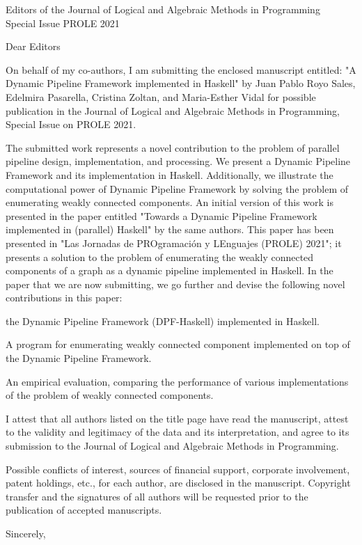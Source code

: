 \documentclass[english]{letter}
\begin{document}
\signature{Prof. Edelmira Pasarella}      


\begin{letter}{
    Editors of the Journal of Logical and Algebraic Methods in Programming\\
    Special Issue PROLE 2021
}

\opening{Dear Editors}

On behalf of my co-authors, I am submitting the enclosed manuscript
entitled: "A Dynamic Pipeline Framework implemented in Haskell" by Juan Pablo Royo Sales, Edelmira Pasarella, Cristina Zoltan, and Maria-Esther Vidal
for possible publication in the Journal of Logical and Algebraic Methods in Programming, Special Issue on PROLE 2021.

The submitted work represents a novel contribution to the problem of parallel pipeline design, implementation, and processing. We present a Dynamic Pipeline Framework and its implementation in Haskell. Additionally, we illustrate the computational power of Dynamic Pipeline Framework by solving the problem of enumerating weakly connected components. 
An initial version of this work is presented in the paper entitled "Towards a Dynamic Pipeline Framework implemented in (parallel) Haskell" by 
the same authors. This paper has been presented in "Las Jornadas de PROgramación y LEnguajes (PROLE) 2021"; it presents a solution to the problem of enumerating the weakly connected components of a graph as a dynamic pipeline implemented in Haskell. 
In the paper that we are now submitting, we go further and devise the 
following novel contributions in this paper:
\begin{inparaenum}[i\upshape)]
\item the Dynamic Pipeline Framework (DPF-Haskell) implemented in Haskell. 
\item A program for enumerating weakly connected component implemented on top of the Dynamic Pipeline Framework.
\item An empirical evaluation, comparing the performance of various implementations of the problem of weakly connected components. 
\end{inparaenum}

I attest that all authors listed on the title page have read the manuscript, attest to the validity and legitimacy of the data and its interpretation, and agree to its submission to the Journal of Logical and Algebraic Methods in Programming.

Possible conflicts of interest, sources of financial support, corporate involvement, patent holdings, etc., for each author, are disclosed in the manuscript. Copyright transfer and the signatures of all authors will be requested prior to the publication of accepted manuscripts.

\closing{Sincerely,} 

\end{letter}
\end{document}
